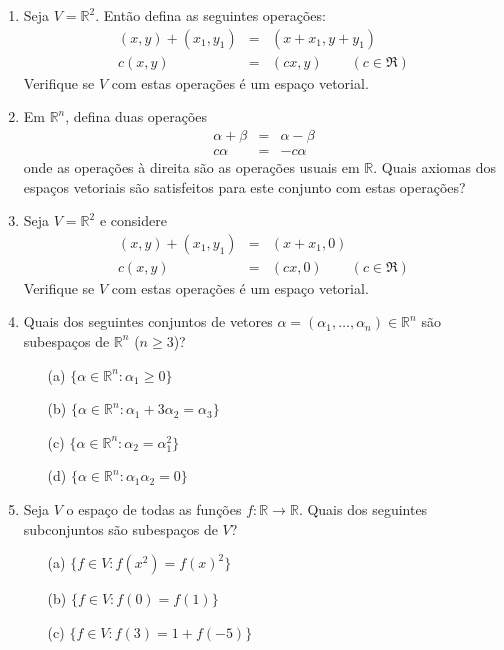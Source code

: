 \documentclass[12pt]{article}
\begin{document}
\begin{enumerate}

\item Seja $V={\mathbb{R}}^2$. Então defina as seguintes operações:
  \begin{eqnarray*}
    (x,y) + (x_1,y_1) &=& (x+x_1,y+y_1)\\
    c(x,y) &=& (cx,y) \qquad (c\in \Re)
  \end{eqnarray*}
  Verifique se $V$ com estas operações é um espaço vetorial.
%
\item Em ${\mathbb{R}}^n$, defina duas operações
  \begin{eqnarray*}
    \alpha + \beta &=& \alpha - \beta\\
    c\alpha &=& -c\alpha
  \end{eqnarray*}
  onde as operações à direita são as operações usuais em $\mathbb{R}$. Quais axiomas dos espaços vetoriais são satisfeitos para este conjunto com estas operações?
%
\item Seja $V={\mathbb{R}}^2$ e considere
  \begin{eqnarray*}
    (x,y) + (x_1,y_1) &=& (x+x_1,0)\\
    c(x,y) &=& (cx,0) \qquad (c\in \Re)
  \end{eqnarray*}
  Verifique se $V$ com estas operações é um espaço vetorial.
% 
\item Quais dos seguintes conjuntos de vetores $\alpha =(\alpha_1,\ldots,\alpha_n) \in {\mathbb{R}}^n$ são subespaços de ${\mathbb{R}}^n$ ($n\geq 3$)?
  \begin{itemize}
  \item[(a)] $\{\alpha \in {\mathbb{R}}^n : \alpha_1\geq 0\}$ 
  \item[(b)] $\{\alpha \in {\mathbb{R}}^n : \alpha_1+3\alpha_2=\alpha_3\}$ 
  \item[(c)] $\{\alpha \in {\mathbb{R}}^n : \alpha_2=\alpha_1^2\}$ 
  \item[(d)] $\{\alpha \in {\mathbb{R}}^n : \alpha_1\alpha_2= 0\}$ 
  \end{itemize}
\item Seja $V$ o espaço de todas as funções $f:{\mathbb{R}} \rightarrow \mathbb{R}$. Quais dos seguintes subconjuntos são subespaços de $V$?
  \begin{itemize}
  \item[(a)] $\{f \in V : f(x^2) = f(x)^2\}$ 
  \item[(b)] $\{f \in V : f(0) = f(1)\}$ 
  \item[(c)] $\{f \in V : f(3) = 1+f(-5)\}$ 

\end{itemize}
\end{enumerate}
\end{document}
